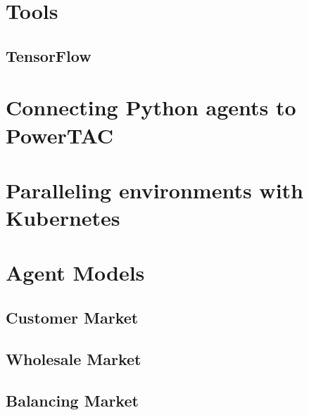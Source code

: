 \section{Tools}
\subsection{TensorFlow}
\section{Connecting Python agents to PowerTAC}
\section{Paralleling environments with Kubernetes}
\section{Agent Models}
\subsection{Customer Market}

%
%

\subsection{Wholesale Market}
\subsection{Balancing Market}
